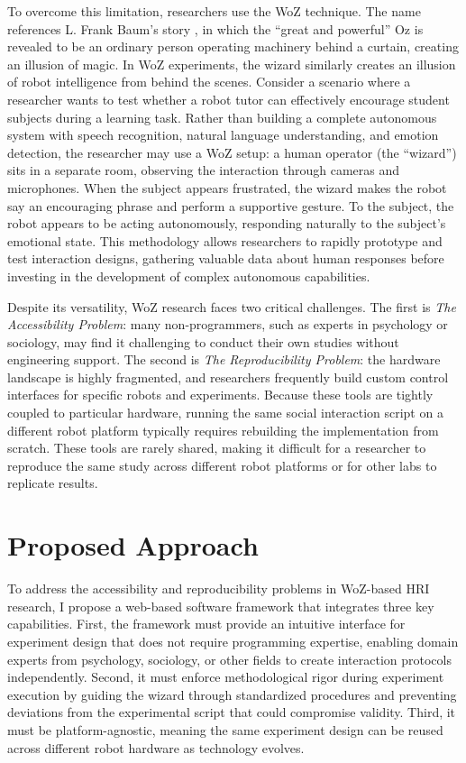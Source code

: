 To overcome this limitation, researchers use the WoZ technique. The name references L. Frank Baum's story \cite{Baum1900}, in which the ``great and powerful'' Oz is revealed to be an ordinary person operating machinery behind a curtain, creating an illusion of magic. In WoZ experiments, the wizard similarly creates an illusion of robot intelligence from behind the scenes. Consider a scenario where a researcher wants to test whether a robot tutor can effectively encourage student subjects during a learning task. Rather than building a complete autonomous system with speech recognition, natural language understanding, and emotion detection, the researcher may use a WoZ setup: a human operator (the ``wizard'') sits in a separate room, observing the interaction through cameras and microphones. When the subject appears frustrated, the wizard makes the robot say an encouraging phrase and perform a supportive gesture. To the subject, the robot appears to be acting autonomously, responding naturally to the subject's emotional state. This methodology allows researchers to rapidly prototype and test interaction designs, gathering valuable data about human responses before investing in the development of complex autonomous capabilities.

Despite its versatility, WoZ research faces two critical challenges. The first is \emph{The Accessibility Problem}: many non-programmers, such as experts in psychology or sociology, may find it challenging to conduct their own studies without engineering support. The second is \emph{The Reproducibility Problem}: the hardware landscape is highly fragmented, and researchers frequently build custom control interfaces for specific robots and experiments. Because these tools are tightly coupled to particular hardware, running the same social interaction script on a different robot platform typically requires rebuilding the implementation from scratch. These tools are rarely shared, making it difficult for a researcher to reproduce the same study across different robot platforms or for other labs to replicate results.

\section{Proposed Approach}

To address the accessibility and reproducibility problems in WoZ-based HRI research, I propose a web-based software framework that integrates three key capabilities. First, the framework must provide an intuitive interface for experiment design that does not require programming expertise, enabling domain experts from psychology, sociology, or other fields to create interaction protocols independently. Second, it must enforce methodological rigor during experiment execution by guiding the wizard through standardized procedures and preventing deviations from the experimental script that could compromise validity. Third, it must be platform-agnostic, meaning the same experiment design can be reused across different robot hardware as technology evolves.

